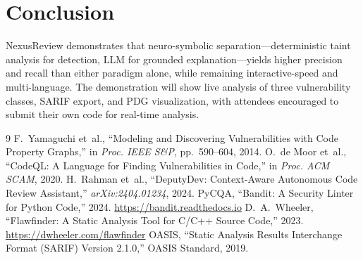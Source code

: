 \documentclass[10pt,conference]{IEEEtran}
\begin{document}
\section{Conclusion}

NexusReview demonstrates that neuro-symbolic separation---deterministic
taint analysis for detection, LLM for grounded explanation---yields
higher precision and recall than either paradigm alone, while remaining
interactive-speed and multi-language. The demonstration will show
live analysis of three vulnerability classes, SARIF export, and PDG
visualization, with attendees encouraged to submit their own code for
real-time analysis.

\begin{thebibliography}{9}
 F.~Yamaguchi et~al., ``Modeling and Discovering Vulnerabilities with Code Property Graphs,'' in \emph{Proc. IEEE S\&P}, pp.~590--604, 2014.
 O.~de Moor et~al., ``CodeQL: A Language for Finding Vulnerabilities in Code,'' in \emph{Proc. ACM SCAM}, 2020.
 H.~Rahman et~al., ``DeputyDev: Context-Aware Autonomous Code Review Assistant,'' \emph{arXiv:2404.01234}, 2024.
 PyCQA, ``Bandit: A Security Linter for Python Code,'' 2024. \url{https://bandit.readthedocs.io}
 D.~A.~Wheeler, ``Flawfinder: A Static Analysis Tool for C/C++ Source Code,'' 2023. \url{https://dwheeler.com/flawfinder}
 OASIS, ``Static Analysis Results Interchange Format (SARIF) Version 2.1.0,'' OASIS Standard, 2019.
\end{thebibliography}
\end{document}
